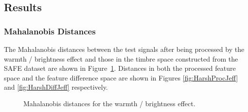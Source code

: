 	\subsection{Results}
	\label{sec:PerceptualExperiments-SemanticControl-Results}
		\subsubsection{Mahalanobis Distances}
			The Mahalanobis distances between the test signals after being processed by the warmth / brightness
			effect and those in the timbre space constructed from the SAFE dataset are shown in
			Figure~\ref{fig:HarshJeffs}. Distances in both the processed feature space and the feature
			difference space are shown in Figures \ref{fig:HarshProcJeff} and \ref{fig:HarshDiffJeff}
			respectively.

			\begin{figure}[h!]
				\centering
				\quad
				\caption{Mahalanobis distances for the warmth / brightness effect.}
				\label{fig:HarshJeffs}
			\end{figure}

